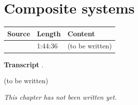\chapter{Composite systems}\label{ch:c34}
\begin{paracol}{2}

\begin{sources}
\begin{tabularx}{\linewidth}{@{}l l L@{}}
\toprule
\textbf{Source} & \textbf{Length} & \textbf{Content}\\
\midrule
{} & 1:44:36 & (to be written)\\
\bottomrule
\end{tabularx}

\smallskip
\textbf{Transcript} .
\end{sources}

\begin{reading}
(to be written)
\end{reading}

\emph{This chapter has not been written yet.}

\flushside
\end{paracol}
